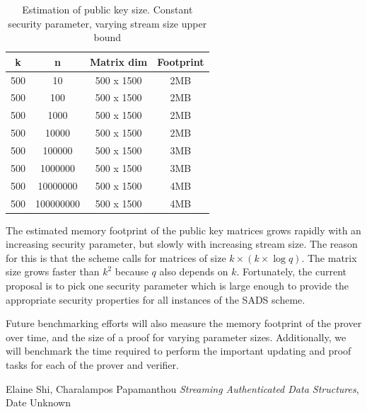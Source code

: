 \documentclass[11pt, letterpaper, oneside]{article}
\begin{document}
	\begin{table}[h]
	\centering
		\begin{tabular}{ c | c | c | c}
		k & n & Matrix dim & Footprint\\ \hline
		500&10&500 x 1500&2MB\\
		500&100&500 x 1500&2MB\\
		500&1000&500 x 1500&2MB\\
		500&10000&500 x 1500&2MB\\
		500&100000&500 x 1500&3MB\\
		500&1000000&500 x 1500&3MB\\
		500&10000000&500 x 1500&4MB\\
		500&100000000&500 x 1500&4MB\\

		\end{tabular}
	\caption{ Estimation of public key size. Constant security parameter, varying stream size upper bound }
	\label{tab:pub-key-n}
	\end{table}


	The estimated memory footprint of the public key matrices grows rapidly with an increasing security parameter, but slowly with increasing stream size.
	The reason for this is that the scheme calls for matrices of size $k  \times ( k \times \log q )$.
	The matrix size grows faster than $k^2$ because $q$ also depends on $k$.
	Fortunately, the current proposal is to pick one security parameter which is large enough to provide the appropriate security properties for all instances of the SADS scheme.

	Future benchmarking efforts will also measure the memory footprint of the prover over time, and the size of a proof for varying parameter sizes. Additionally, we will benchmark the time required to perform the important updating and proof tasks for each of the prover and verifier.





\begin{thebibliography}{9}
	 Elaine Shi, Charalampos Papamanthou \emph{Streaming Authenticated Data Structures}, Date Unknown
	\end{thebibliography}
\end{document}
